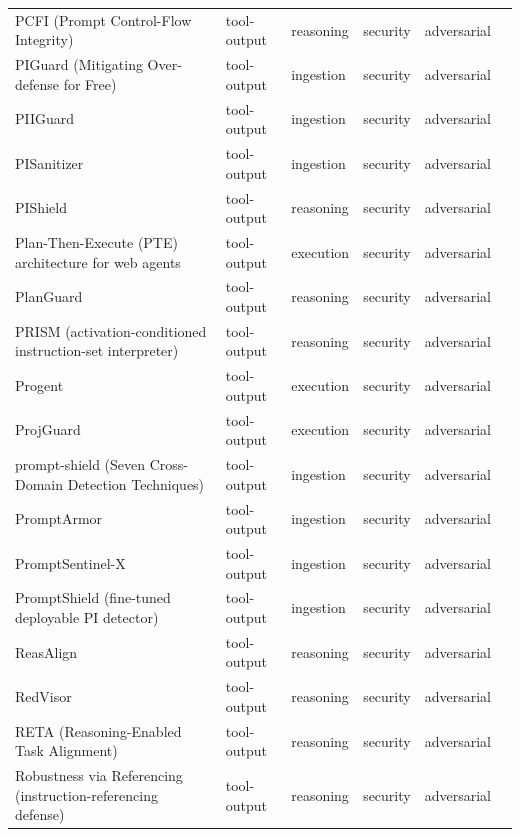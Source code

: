 \begin{longtable}{@{}>{\raggedright\arraybackslash}p{}lllll@{}}
PCFI (Prompt Control-Flow Integrity) & tool-output & reasoning & security & adversarial & \cite{alam-2026-prompt} \\
PIGuard (Mitigating Over-defense for Free) & tool-output & ingestion & security & adversarial & \cite{li-2025-piguard} \\
PIIGuard & tool-output & ingestion & security & adversarial & \cite{liu-2026-piiguard} \\
PISanitizer & tool-output & ingestion & security & adversarial & \cite{geng-2025-pisanitizer} \\
PIShield & tool-output & reasoning & security & adversarial & \cite{zou-2025-pishield} \\
Plan-Then-Execute (PTE) architecture for web agents & tool-output & execution & security & adversarial & \cite{piet-2026-web} \\
PlanGuard & tool-output & reasoning & security & adversarial & \cite{gong-2026-planguard} \\
PRISM (activation-conditioned instruction-set interpreter) & tool-output & reasoning & security & adversarial & \cite{gressel-2026-prism} \\
Progent & tool-output & execution & security & adversarial & \cite{shi-2025-progent} \\
ProjGuard & tool-output & execution & security & adversarial & \cite{contreras-2026-projguard} \\
prompt-shield (Seven Cross-Domain Detection Techniques) & tool-output & ingestion & security & adversarial & \cite{munirathinam-2026-pattern} \\
PromptArmor & tool-output & ingestion & security & adversarial & \cite{shi-2025-promptarmor} \\
PromptSentinel-X & tool-output & ingestion & security & adversarial & \cite{zhuhadar-2026-promptsentinelx} \\
PromptShield (fine-tuned deployable PI detector) & tool-output & ingestion & security & adversarial & \cite{jacob-2024-promptshield} \\
ReasAlign & tool-output & reasoning & security & adversarial & \cite{li-2026-reasalign} \\
RedVisor & tool-output & reasoning & security & adversarial & \cite{liu-2026-redvisor} \\
RETA (Reasoning-Enabled Task Alignment) & tool-output & reasoning & security & adversarial & \cite{he-2026-defending} \\
Robustness via Referencing (instruction-referencing defense) & tool-output & reasoning & security & adversarial & \cite{chen-2025-robustness} \\

\end{longtable}
